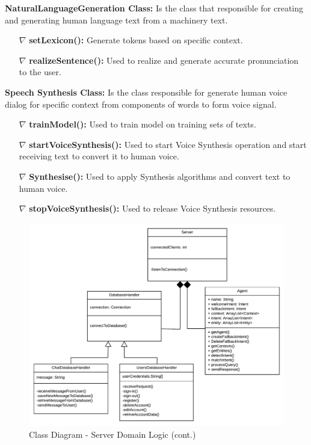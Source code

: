 \documentclass{scrreprt}
\begin{document}
\textbf{NaturalLanguageGeneration Class:} Is the class that responsible for creating and generating human language text from a machinery text.
\begin{itemize}

	\item[$\nabla$] \textbf{setLexicon():} Generate tokens based on specific context.
	\item[$\nabla$] \textbf{realizeSentence():} Used to realize and generate accurate pronunciation to the user.
\end{itemize}

\textbf{Speech Synthesis Class:} Is the class responsible for generate human voice dialog for specific context from components of words to form voice signal.
\begin{itemize}

	\item[$\nabla$] \textbf{trainModel():} Used to train model on training sets of texts.
	\item[$\nabla$] \textbf{startVoiceSynthesis():} Used to start Voice Synthesis operation and start receiving text to convert it to human voice.
	\item[$\nabla$] \textbf{Synthesise():} Used to apply Synthesis algorithms and convert text to human voice.
	\item[$\nabla$] \textbf{stopVoiceSynthesis():} Used to release Voice Synthesis resources.
\end{itemize}



\clearpage

\begin{figure}[ht!]
    \includegraphics[angle=90, height=.92\textheight]{img3/ClassDiagramServerLogic.pdf}
    \caption{Class Diagram - Server Domain Logic (cont.)}
    \label{fig:classdiagram1}
\end{figure}
\end{document}
